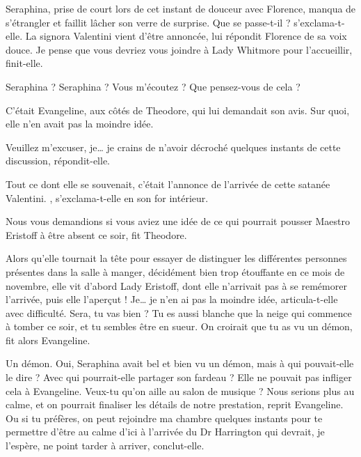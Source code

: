 Seraphina, prise de court lors de cet instant de douceur avec Florence, manqua de s’étrangler et faillit lâcher son verre de surprise.
\rep Que se passe-t-il ?
s'exclama-t-elle.
\rep La signora Valentini vient d'être annoncée, lui répondit Florence de sa voix douce.
Je pense que vous devriez vous joindre à Lady Whitmore pour l’accueillir, finit-elle.

\separation

\rep Seraphina ?
Seraphina ?
Vous m’écoutez ?
Que pensez-vous de cela ?

C’était Evangeline, aux côtés de Theodore, qui lui demandait son avis.
Sur quoi, elle n'en avait pas la moindre idée.

\rep Veuillez m'excuser, je\ldots{} je crains de n'avoir décroché quelques instants de cette discussion, répondit-elle.

Tout ce dont elle se souvenait, c’était l'annonce de l’arrivée de cette satanée Valentini.
, s’exclama-t-elle en son for intérieur.

\rep Nous vous demandions si vous aviez une idée de ce qui pourrait pousser Maestro Eristoff à être absent ce soir, fit Theodore.

Alors qu'elle tournait la tête pour essayer de distinguer les différentes personnes présentes dans la salle à manger, décidément bien trop étouffante en ce mois de novembre, elle vit d'abord Lady Eristoff, dont elle n’arrivait pas à se remémorer l'arrivée, puis elle l’aperçut !
\rep Je\ldots{} je n'en ai pas la moindre idée, articula-t-elle avec difficulté.
\rep Sera, tu vas bien ? 
Tu es aussi blanche que la neige qui commence à tomber ce soir, et tu sembles être en sueur.
On croirait que tu as vu un démon, fit alors Evangeline.

Un démon.
Oui, Seraphina avait bel et bien vu un démon, mais à qui pouvait-elle le dire ?
Avec qui pourrait-elle partager son fardeau ?
Elle ne pouvait pas infliger cela à Evangeline.
\rep Veux-tu qu'on aille au salon de musique ?
Nous serions plus au calme, et on pourrait finaliser les détails de notre prestation, reprit Evangeline.
Ou si tu préfères, on peut rejoindre ma chambre quelques instants pour te permettre d'être au calme d'ici à l'arrivée du Dr Harrington qui devrait, je l'espère, ne point tarder à arriver, conclut-elle.

